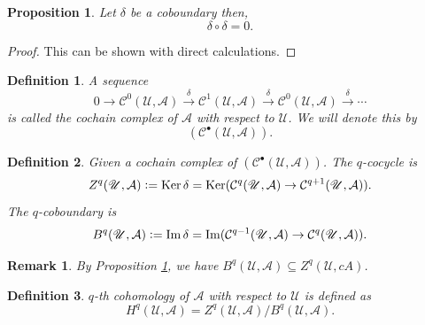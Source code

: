 \documentclass{article}
\newtheorem{proposition}{Proposition}[section]
\newtheorem{definition}{Definition}[section]
\newtheorem{remark}{Remark}[section]
\DeclareMathOperator{\Ker}{Ker}
\DeclareMathOperator{\Image}{Im}
\newcommand{\defeq}{\vcentcolon=}
\newcommand{\cA}[0]{\mathcal{A}}
\newcommand{\cC}[0]{\mathcal{C}}
\begin{document}
\begin{proposition}
  Let $\delta$ be a coboundary then,
  \begin{equation*}
    \delta\circ\delta = 0.
  \end{equation*}
  \label{chain_complex_boundary}
\end{proposition}

\begin{proof}
  This can be shown with direct calculations. 
\end{proof}

\begin{definition}
  A sequence 
  \begin{equation*}
  0\to \cC^0(\mathscr{U},\cA)\stackrel{\delta}{\to} \cC^1(\mathscr{U},\cA)\stackrel{\delta}{\to} \cC^0(\mathscr{U},\cA)\stackrel{\delta}{\to}\cdots
\end{equation*}
is called the cochain complex of $\cA$ with respect to $\mathscr{U}$. We will denote this by 
\begin{equation*}
  (\mathscr{C}^\bullet(\mathscr{U},\cA)).
\end{equation*}
\end{definition}

\begin{definition}
  Given a cochain complex of $(\mathscr{C}^\bullet(\mathscr{U},\cA))$. The $q$-cocycle is 
  \begin{equation*}
    Z^q(\mathscr{U},\cA) \defeq \Ker\delta=\Ker(\cC^q(\mathscr{U},\cA)\to \cC^{q+1}(\mathscr{U},\cA)).
  \end{equation*}
  The $q$-coboundary is 
  \begin{equation*}
    B^q(\mathscr{U},\cA) \defeq \Image\delta=\Image(\cC^{q-1}(\mathscr{U},\cA)\to \cC^{q}(\mathscr{U},\cA)).
  \end{equation*}
\end{definition}

\begin{remark}
  By Proposition \ref{chain_complex_boundary}, we have $B^q(\mathscr{U},\cA)\subseteq Z^q(\mathscr{U},cA)$.
\end{remark}

\begin{definition}
  $q$-th cohomology of $\cA$ with respect to $\mathscr{U}$ is defined as 
  \begin{equation*}
    H^q(\mathscr{U},\cA) = Z^q(\mathscr{U},\cA)/B^q(\mathscr{U},\cA).
  \end{equation*}
\end{definition}
\end{document}
